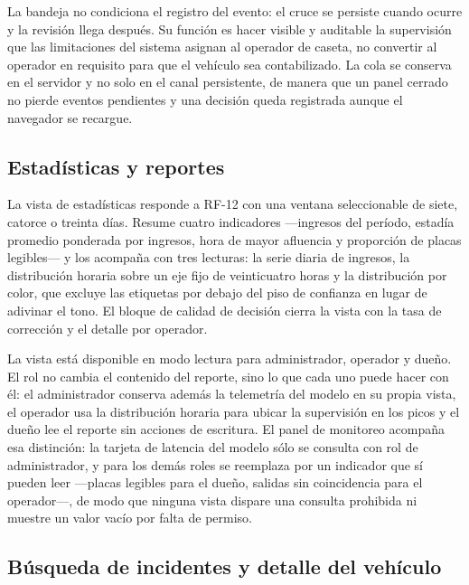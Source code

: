La bandeja no condiciona el registro del evento: el cruce se persiste cuando
ocurre y la revisión llega después. Su función es hacer visible y auditable la
supervisión que las limitaciones del sistema asignan al operador de caseta, no
convertir al operador en requisito para que el vehículo sea contabilizado. La
cola se conserva en el servidor y no solo en el canal persistente, de manera que
un panel cerrado no pierde eventos pendientes y una decisión queda registrada
aunque el navegador se recargue.

\subsection{Estadísticas y reportes}

La vista de estadísticas responde a RF-12 con una ventana seleccionable de siete,
catorce o treinta días. Resume cuatro indicadores ---ingresos del período,
estadía promedio ponderada por ingresos, hora de mayor afluencia y proporción de
placas legibles--- y los acompaña con tres lecturas: la serie diaria de ingresos,
la distribución horaria sobre un eje fijo de veinticuatro horas y la distribución
por color, que excluye las etiquetas por debajo del piso de confianza en lugar de
adivinar el tono. El bloque de calidad de decisión cierra la vista con la tasa de
corrección y el detalle por operador.

La vista está disponible en modo lectura para administrador, operador y dueño. El
rol no cambia el contenido del reporte, sino lo que cada uno puede hacer con él: el
administrador conserva además la telemetría del modelo en su propia vista, el
operador usa la distribución horaria para ubicar la supervisión en los picos y el
dueño lee el reporte sin acciones de escritura. El panel de monitoreo acompaña esa
distinción: la tarjeta de latencia del modelo sólo se consulta con rol de
administrador, y para los demás roles se reemplaza por un indicador que sí pueden
leer ---placas legibles para el dueño, salidas sin coincidencia para el
operador---, de modo que ninguna vista dispare una consulta prohibida ni muestre un
valor vacío por falta de permiso.

\subsection{Búsqueda de incidentes y detalle del vehículo}
\label{subsec:detalle_vehiculo}

